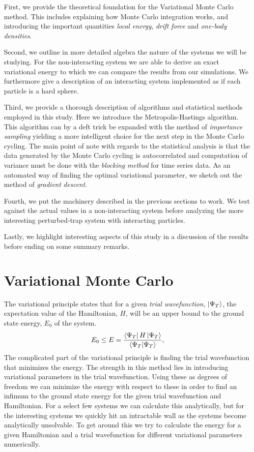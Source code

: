 \documentclass[
    a4paper, aps, twocolumn, floatfix, superscriptaddress,
    nofootinbib]{revtex4-1}
\newcommand{\1}{\mathds{1}}
\begin{document}
    First, we provide the theoretical foundation for the Variational Monte Carlo
    method. This includes explaining how Monte Carlo integration works, and
    introducing the important quantities \emph{local energy}, \emph{drift force}
    and \emph{one-body densities}.

    Second, we outline in more detailed algebra the nature of the systems we
    will be studying. For the non-interacting system we are able to derive an
    exact variational energy to which we can compare the results from our
    simulations. We furthermore give a description of an interacting system
    implemented as if each particle is a hard sphere.

    Third, we provide a thorough description of algorithms and statistical
    methods employed in this study. Here we introduce the Metropolis-Hastings
    algorithm. This algorithm can by a deft trick be expanded with the method of
    \emph{importance sampling} yielding a more intelligent choice for the next
    step in the Monte Carlo cycling.  The main point of note with regards to the
    statistical analysis is that the data generated by the Monte Carlo cycling
    is autocorrelated and computation of variance must be done with the
    \emph{blocking method} for time series data.  As an automated way of finding
    the optimal variational parameter, we sketch out the method of
    \emph{gradient descent}.

    Fourth, we put the machinery described in the previous sections to work. We
    test against the actual values in a non-interacting system before analyzing
    the more interesting perturbed-trap system with interacting particles.

    Lastly, we highlight interesting aspects of this study in a discussion of
    the results before ending on some summary remarks.

\section{Variational Monte Carlo}
    The variational principle states that for a given \emph{trial wavefunction},
    $\ket{\Psi_T}$, the expectation value of the Hamiltonian, $H$, will be an
    upper bound to the ground state energy, $E_0$ of the system.
    \begin{align}
        E_0 \leq E
        = \frac{\bra{\Psi_T}H\ket{\Psi_T}}{\bra{\Psi_T}\ket{\Psi_T}},
    \end{align}
    The complicated part of the variational principle is finding the trial
    wavefunction that minimizes the energy. The strength in this method lies in
    introducing variational parameters in the trial wavefunction. Using these as
    degrees of freedom we can minimize the energy with respect to these in order
    to find an infimum to the ground state energy for the given trial
    wavefunction and Hamiltonian. For a select few systems we can calculate this
    analytically, but for the interesting systems we quickly hit an intractable
    wall as the systems become analytically unsolvable. To get around this we
    try to calculate the energy for a given Hamiltonian and a trial wavefunction
    for different variational parameters numerically.
\end{document}
